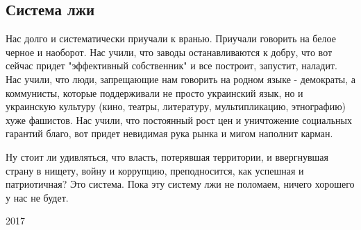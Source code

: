  
 
 
 
 
\subsection{Система лжи}
\label{sec:15_04_2021.fb.zharkih_denis.1.sistema_lzhi}

Нас долго и систематически приучали к вранью. Приучали говорить на белое черное
и наоборот. Нас учили, что заводы останавливаются к добру, что вот сейчас
придет "эффективный собственник" и все построит, запустит, наладит. Нас учили,
что люди, запрещающие нам говорить на родном языке - демократы, а коммунисты,
которые поддерживали не просто украинский язык, но и украинскую культуру (кино,
театры, литературу, мультипликацию, этнографию) хуже фашистов. Нас учили, что
постоянный рост цен и уничтожение социальных гарантий благо, вот придет
невидимая рука рынка и мигом наполнит карман. 

Ну стоит ли удивляться, что власть, потерявшая территории, и ввергнувшая страну
в нищету, войну и коррупцию, преподносится, как успешная и патриотичная? Это
система. Пока эту систему лжи не поломаем, ничего хорошего у нас не будет.

2017
